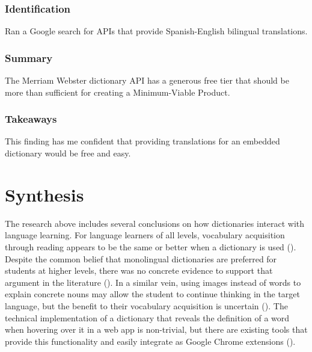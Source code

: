 \documentclass[
	letterpaper, %
]{jdf}
\newcommand{\pcite}[1]{(\cite{#1})}
\begin{document}
\subsubsection{Identification}
Ran a Google search for APIs that provide Spanish-English bilingual translations.
\subsubsection{Summary}
The Merriam Webster dictionary API has a generous free tier that should be more than sufficient for creating a Minimum-Viable Product.

\subsubsection{Takeaways}
This finding has me confident that providing translations for an embedded dictionary would be free and easy.

\section{Synthesis}

The research above includes several conclusions on how dictionaries interact with language learning. For language learners of all levels, vocabulary acquisition through reading appears to be the same or better when a dictionary is used \pcite{dictionaryimportance, dictionaryvalue}. Despite the common belief that monolingual dictionaries are preferred for students at higher levels, there was no concrete evidence to support that argument in the literature \pcite{bilingual_dictionary}. In a similar vein, using images instead of words to explain concrete nouns may allow the student to continue thinking in the target language, but the benefit to their vocabulary acquisition is uncertain \pcite{imagesdictionary}. The technical implementation of a dictionary that reveals the definition of a word when hovering over it in a web app is non-trivial, but there are existing tools that provide this functionality and easily integrate as Google Chrome extensions \pcite{tooltipdictionary}.
\end{document}
